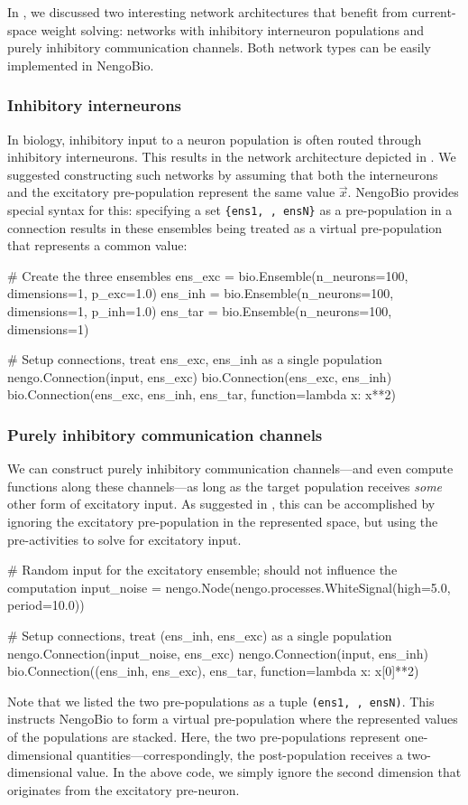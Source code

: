 In , we discussed two interesting network architectures that benefit from current-space weight solving: networks with inhibitory interneuron populations and purely inhibitory communication channels.
Both network types can be easily implemented in NengoBio.

\subsubsection{Inhibitory interneurons}
In biology, inhibitory input to a neuron population is often routed through inhibitory interneurons.
This results in the network architecture depicted in .
We suggested constructing such networks by assuming that both the interneurons and the excitatory pre-population represent the same value $\vec x$.
NengoBio provides special syntax for this: specifying a set \texttt{\{ens1, \textellipsis, ensN\}} as a pre-population in a connection results in these ensembles being treated as a virtual pre-population that represents a common value:
\begin{pythoncode}
# Create the three ensembles
ens_exc = bio.Ensemble(n_neurons=100, dimensions=1, p_exc=1.0)
ens_inh = bio.Ensemble(n_neurons=100, dimensions=1, p_inh=1.0)
ens_tar = bio.Ensemble(n_neurons=100, dimensions=1)

# Setup connections, treat {ens_exc, ens_inh} as a single population
nengo.Connection(input, ens_exc)
bio.Connection(ens_exc, ens_inh)
bio.Connection({ens_exc, ens_inh}, ens_tar, function=lambda x: x**2)
\end{pythoncode}

\subsubsection{Purely inhibitory communication channels}
We can construct purely inhibitory communication channels---and even compute functions along these channels---as long as the target population receives \emph{some} other form of excitatory input.
As suggested in , this can be accomplished by ignoring the excitatory pre-population in the represented space, but using the pre-activities to solve for excitatory input.
\begin{pythoncode}
# Random input for the excitatory ensemble; should not influence the computation
input_noise = nengo.Node(nengo.processes.WhiteSignal(high=5.0, period=10.0))

# Setup connections, treat (ens_inh, ens_exc) as a single population
nengo.Connection(input_noise, ens_exc)
nengo.Connection(input, ens_inh)
bio.Connection((ens_inh, ens_exc), ens_tar, function=lambda x: x[0]**2)
\end{pythoncode}
Note that we listed the two pre-populations as a tuple \texttt{(ens1, \textellipsis, ensN)}.
This instructs NengoBio to form a virtual pre-population where the represented values of the populations are stacked.
Here, the two pre-populations represent one-dimensional quantities---correspondingly, the post-population receives a two-dimensional value.
In the above code, we simply ignore the second dimension that originates from the excitatory pre-neuron.

